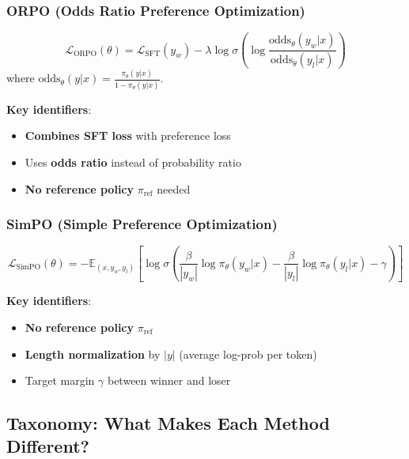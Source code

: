 \subsubsection{ORPO (Odds Ratio Preference Optimization)}
\[
    \mathcal{L}_{\text{ORPO}}(\theta) = \mathcal{L}_{\text{SFT}}(y_w) - \lambda \log \sigma\left( \log \frac{\text{odds}_\theta(y_w|x)}{\text{odds}_\theta(y_l|x)} \right)
\]
where $\text{odds}_\theta(y|x) = \frac{\pi_\theta(y|x)}{1 - \pi_\theta(y|x)}$.

\textbf{Key identifiers}:
\begin{itemize}
    \item \textbf{Combines SFT loss} with preference loss
    \item Uses \textbf{odds ratio} instead of probability ratio
    \item \textbf{No reference policy} $\pi_{\text{ref}}$ needed
\end{itemize}

\subsubsection{SimPO (Simple Preference Optimization)}
\[
    \mathcal{L}_{\text{SimPO}}(\theta) = -\mathbb{E}_{(x, y_w, y_l)} \left[ \log \sigma\left( \frac{\beta}{|y_w|} \log \pi_\theta(y_w|x) - \frac{\beta}{|y_l|} \log \pi_\theta(y_l|x) - \gamma \right) \right]
\]

\textbf{Key identifiers}:
\begin{itemize}
    \item \textbf{No reference policy} $\pi_{\text{ref}}$
    \item \textbf{Length normalization} by $|y|$ (average log-prob per token)
    \item Target margin $\gamma$ between winner and loser
\end{itemize}

\subsection{Taxonomy: What Makes Each Method Different?}

